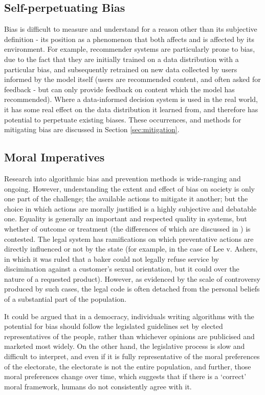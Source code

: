 \documentclass[conference]{IEEEtran}
\begin{document}
\subsection{Self-perpetuating Bias}
Bias is difficult to measure and understand for a reason other than its subjective definition - its position as a phenomenon that both affects and is affected by its environment. For example, recommender systems are particularly prone to bias\cite{DBLP:journals/corr/SchnabelSSCJ16}, due to the fact that they are initially trained on a data distribution with a particular bias, and subsequently retrained on new data collected by users informed by the model itself (users are recommended content, and often asked for feedback - but can only provide feedback on content which the model has recommended). Where a data-informed decision system is used in the real world, it has some real effect on the data distribution it learned from, and therefore has potential to perpetuate existing biases. These occurrences, and methods for mitigating bias are discussed in Section \ref{sec:mitigation}.
\subsection{Moral Imperatives}
Research into algorithmic bias and prevention methods is wide-ranging and ongoing. However, understanding the extent and effect of bias on society is only one part of the challenge; the available actions to mitigate it another; but the choice in which actions are morally justified is a highly subjective and debatable one. Equality is generally an important and respected quality in systems, but whether of outcome or treatment (the differences of which are discussed in \cite{article}) is contested. The legal system has ramifications on which preventative actions are directly influenced or not by the state (for example, in the case of Lee v. Ashers, in which it was ruled that a baker could not legally refuse service by discimination against a customer's sexual orientation, but it could over the nature of a requested product\cite{lee_ashers}). However, as evidenced by the scale of controversy produced by such cases, the legal code is often detached from the personal beliefs of a substantial part of the population. 

It could be argued that in a democracy, individuals writing algorithms with the potential for bias should follow the legislated guidelines set by elected representatives of the people, rather than whichever opinions are publicised and marketed most widely. On the other hand, the legislative process is slow and difficult to interpret, and even if it is fully representative of the moral preferences of the electorate, the electorate is not the entire population, and further, those moral preferences change over time\cite{Garvey2018}, which suggests that if there is a `correct' moral framework, humans do not consistently agree with it.
\end{document}
